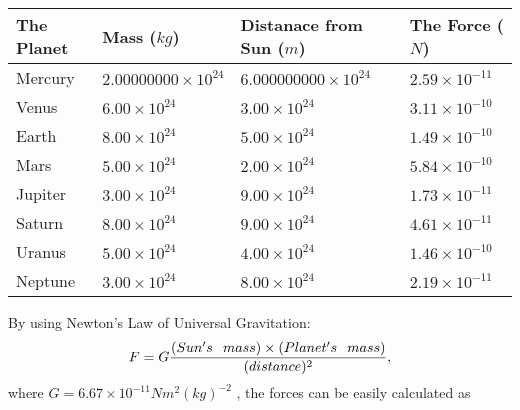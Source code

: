 \documentclass[12pt]{article}
\begin{document}
 
\begin{tabular}{|l|l|l|l|}
\hline
The Planet & Mass ($kg$) & Distanace from Sun ($m$) & The Force ($N$)\\
\hline
Mercury  &
           $ %
2.00000000 \times 10^{24} $   &
             $ %
6.000000000 \times 10^{24} $    & $ %
2.59 \times 10^{-11} $
\\  \hline
Venus    &
           $  %
6.00 \times 10^{24}  $     &
             $ %
3.00 \times 10^{24} $    & $ %
3.11 \times 10^{-10} $
\\  \hline
Earth    &
           $  %
8.00 \times 10^{24}  $     &
             $ %
5.00 \times 10^{24} $    & $ %
1.49 \times 10^{-10} $
\\   \hline
Mars     &
           $  %
5.00 \times 10^{24} $     &
             $ %
2.00 \times 10^{24} $    & $ %
5.84 \times 10^{-10} $
\\   \hline
Jupiter  &
           $  %
3.00 \times 10^{24} $    &
             $ %
9.00 \times 10^{24} $    & $ %
1.73 \times 10^{-11} $
\\  \hline
Saturn   &
           $  %
8.00 \times 10^{24} $    &
             $ %
9.00 \times 10^{24}  $    & $ %
4.61 \times 10^{-11} $
\\  \hline
Uranus   &
           $  %
5.00 \times 10^{24} $    &
             $ %
4.00 \times 10^{24} $    & $ %
1.46 \times 10^{-10} $
\\  \hline
Neptune  &
           $  %
3.00 \times 10^{24} $    &
             $ %
8.00 \times 10^{24} $    & $ %
2.19 \times 10^{-11} $
\\  \hline
 
\end{tabular}
 
 
 
 
 
 
\noindent{}

By using Newton's Law of Universal Gravitation:
\[
F=G \frac{(Sun's \hspace{0.1in} mass) \times (Planet's \hspace{0.1in} mass)} { (distance)^2},
\]
where
$ G= %
6.67 \times 10^{-11} N m^{2}(kg)^{-2}$ , the forces can be easily calculated as
 
\vspace{0.2in}
 
\end{document}
